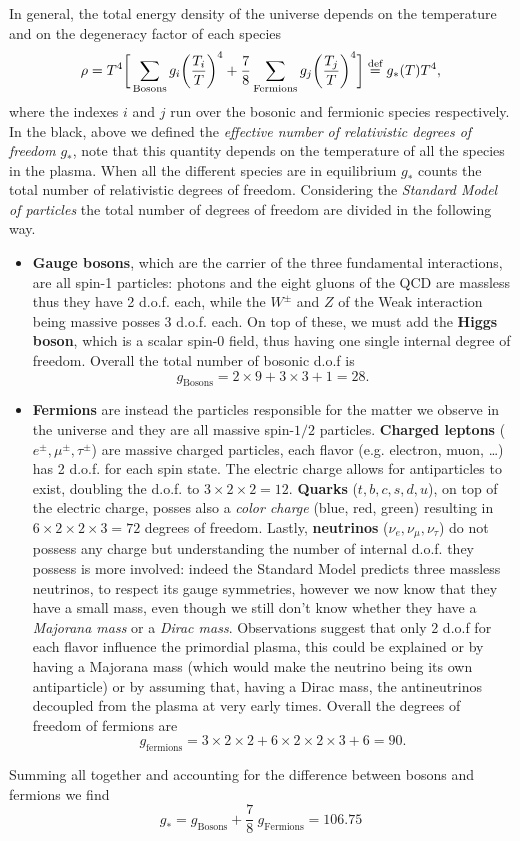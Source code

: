 In general, the total energy density of the universe depends on the temperature and on the degeneracy factor of each species
\begin{equation}
    \rho=T^4\bigg[\sum_{\text{Bosons}}g_i\bigg(\frac{T_i}{T}\bigg)^4+\frac{7}{8}\sum_{\text{Fermions}}g_j\bigg(\frac{T_j}{T}\bigg)^4\bigg]\stackrel{\text{def}}{=} g_{*}(T)T^4, \label{eq:total_energy_density}
\end{equation}
where the indexes $i$ and $j$ run over the bosonic and fermionic species respectively. In the black, above we defined the \emph{effective number of relativistic degrees of freedom} $g_*$, note that this quantity depends on the temperature of all the species in the plasma. When all the different species are in equilibrium $g_*$ counts the total number of relativistic degrees of freedom. Considering the \emph{Standard Model of particles} the total number of degrees of freedom are divided in the following way.
\begin{itemize}
    \item \textbf{Gauge bosons}, which are the carrier of the three fundamental interactions, are all spin-1 particles: photons and the eight gluons of the QCD are massless thus they have 2 d.o.f. each, while the $W^\pm$ and $Z$ of the Weak interaction being massive posses 3 d.o.f. each. On top of these, we must add the \textbf{Higgs boson}, which is a scalar spin-0 field, thus having one single internal degree of freedom. Overall the total number of bosonic d.o.f is
    $$g_\text{Bosons}=2\times 9+3\times3+1= 28.$$
    \item \textbf{Fermions} are instead the particles responsible for the matter we observe in the universe and they are all massive spin-$1/2$ particles. \textbf{Charged leptons} ($e^\pm,\mu^\pm,\tau^\pm$) are massive charged particles, each flavor (e.g. electron, muon, \dots) has 2 d.o.f. for each spin state. The electric charge allows for antiparticles to exist, doubling the d.o.f. to $3\times2\times2=12$. \textbf{Quarks} ($t,b,c,s,d,u$), on top of the electric charge, posses also a \emph{color charge} (blue, red, green) resulting in $6\times2\times2\times3=72$ degrees of freedom. Lastly, \textbf{neutrinos} ($\nu_e,\nu_\mu,\nu_\tau$) do not possess any charge but understanding the number of internal d.o.f. they possess is more involved: indeed the Standard Model predicts three massless neutrinos, to respect its gauge symmetries, however we now know that they have a small mass, even though we still don't know whether they have a \emph{Majorana mass} or a \emph{Dirac mass}. Observations suggest that only 2 d.o.f for each flavor influence the primordial plasma, this could be explained or by having a Majorana mass (which would make the neutrino being its own antiparticle) or by assuming that, having a Dirac mass, the antineutrinos decoupled from the plasma at very early times. Overall the degrees of freedom of fermions are
    $$
    g_\text{fermions}=3\times2\times2+6\times2\times2\times3+6=90.
    $$
\end{itemize}
Summing all together and accounting for the difference between bosons and fermions we find
\begin{equation}
    g_*=g_\text{Bosons} + \frac{7}{8}\ g_\text{Fermions}=106.75
    \label{eq:relativ_dof}
\end{equation}
